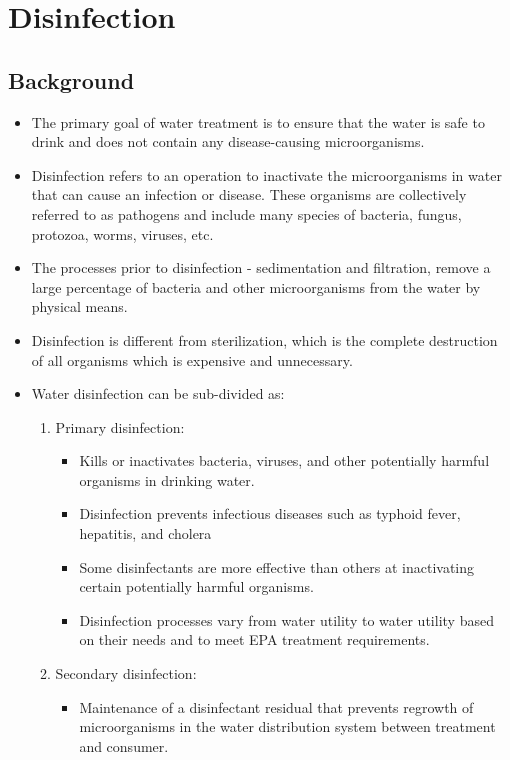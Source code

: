 
\chapter{Disinfection}

\section{Background}
\begin{itemize}
\item The primary goal of water treatment is to ensure that the water is safe to drink and does not contain any disease-causing microorganisms. 
\item Disinfection refers to an operation to inactivate the microorganisms in water that can cause an infection or disease. These organisms are collectively referred to as pathogens and include many species of bacteria, fungus, protozoa, worms, viruses, etc.
\item The processes prior to disinfection - sedimentation and filtration, remove a large percentage of bacteria and other microorganisms from the water by physical means.
\item Disinfection is different from sterilization, which is the complete destruction of all organisms which is expensive and unnecessary.
\item Water disinfection can be sub-divided as:
\begin{enumerate}
\item Primary disinfection:
\begin{itemize}
\item Kills or inactivates bacteria, viruses, and other potentially harmful organisms in drinking water.
\item Disinfection prevents infectious diseases such as typhoid fever, hepatitis, and
cholera
\item Some disinfectants are more effective than others at inactivating certain
potentially harmful organisms.
\item Disinfection processes vary from water utility to water utility based on their
needs and to meet EPA treatment requirements.
\end{itemize}
\item Secondary disinfection:
\begin{itemize}
\item Maintenance of a disinfectant residual that prevents regrowth of microorganisms in the water distribution system between treatment and consumer.

\end{itemize}
\end{enumerate}
\end{itemize}
